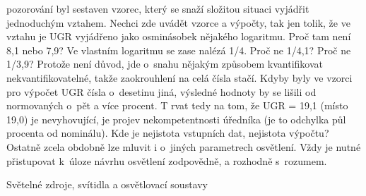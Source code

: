 pozorování byl sestaven vzorec, který se snaží složitou situaci vyjádřit jednoduchým vztahem.
Nechci zde uvádět vzorce a výpočty, tak jen tolik, že ve vztahu je UGR vyjádřeno jako osminásobek
nějakého logaritmu. Proč tam není 8,1 nebo 7,9? Ve vlastním logaritmu se zase nalézá 1/4.
Proč ne 1/4,1? Proč ne 1/3,9? Protože není důvod, jde o~snahu nějakým způsobem kvantifikovat
nekvantifikovatelné, takže zaokrouhlení na celá čísla stačí. Kdyby byly ve vzorci pro výpočet
UGR čísla o~desetinu jiná, výsledné hodnoty by se lišili od normovaných o~pět a více procent. T
rvat tedy na tom, že UGR = 19,1 (místo 19,0) je nevyhovující, je projev nekompetentnosti úředníka
(je to odchylka půl procenta od nominálu). Kde je nejistota vstupních dat, nejistota výpočtu?
Ostatně zcela obdobně lze mluvit i o~jiných parametrech osvětlení. Vždy je nutné přistupovat
k~úloze návrhu osvětlení zodpovědně, a rozhodně s~rozumem.

\sec Světelné zdroje, svítidla a osvětlovací soustavy

